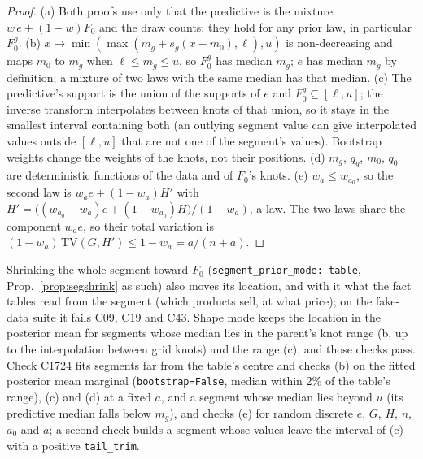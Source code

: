 \begin{proof}
(a) Both proofs use only that the predictive is the mixture $w\,e+(1-w)F_0$ and the draw counts; they hold for any prior law, in particular $F_0^g$. (b) $x\mapsto\min(\max(m_g+s_g(x-m_0),\ell),u)$ is non-decreasing and maps $m_0$ to $m_g$ when $\ell\le m_g\le u$, so $F_0^g$ has median $m_g$; $e$ has median $m_g$ by definition; a mixture of two laws with the same median has that median. (c) The predictive's support is the union of the supports of $e$ and $F_0^g\subseteq[\ell,u]$; the inverse transform interpolates between knots of that union, so it stays in the smallest interval containing both (an outlying segment value can give interpolated values outside $[\ell,u]$ that are not one of the segment's values). Bootstrap weights change the weights of the knots, not their positions. (d) $m_g$, $q_g$, $m_0$, $q_0$ are deterministic functions of the data and of $F_0$'s knots. (e) $w_a\le w_{a_0}$, so the second law is $w_a e+(1-w_a)H'$ with $H'=\big((w_{a_0}-w_a)e+(1-w_{a_0})H\big)/(1-w_a)$, a law. The two laws share the component $w_a e$, so their total variation is $(1-w_a)\,\mathrm{TV}(G,H')\le1-w_a=a/(n+a)$.
\end{proof}
\noindent Shrinking the whole segment toward $F_0$ (\texttt{segment\_prior\_mode: table}, Prop.~\ref{prop:segshrink} as such) also moves its location, and with it what the fact tables read from the segment (which products sell, at what price); on the fake-data suite it fails C09, C19 and C43. Shape mode keeps the location in the posterior mean for segments whose median lies in the parent's knot range (b, up to the interpolation between grid knots) and the range (c), and those checks pass. Check C1724 fits segments far from the table's centre and checks (b) on the fitted posterior mean marginal (\texttt{bootstrap=False}, median within 2\% of the table's range), (c) and (d) at a fixed $a$, and a segment whose median lies beyond $u$ (its predictive median falls below $m_g$), and checks (e) for random discrete $e$, $G$, $H$, $n$, $a_0$ and $a$; a second check builds a segment whose values leave the interval of (c) with a positive \texttt{tail\_trim}.


